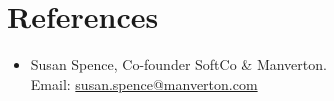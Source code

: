 \documentclass[letterpaper,10pt]{article}
\newcommand{\resumeSubHeadingListStart}{\begin{itemize}[leftmargin=0.15in, label={}]}
\newcommand{\resumeSubHeadingListEnd}{\end{itemize}}
\begin{document}









\section{References}
  \vspace{2pt}

  
  \resumeSubHeadingListStart
  \item{Susan Spence, Co-founder SoftCo \& Manverton. \\ Email: \href{susan.spence@manverton.com}{susan.spence@manverton.com}}
   \resumeSubHeadingListEnd




\end{document}
